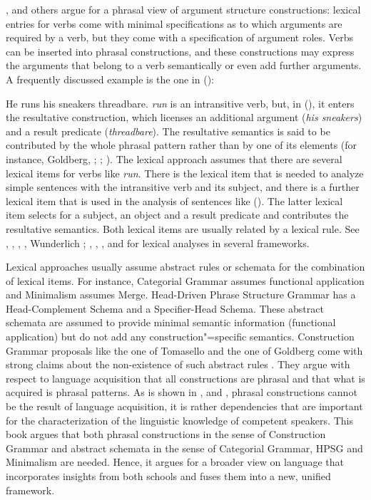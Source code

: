 \citet{Goldberg95a,Goldberg2006a}, \citet{Tomasello2003a} and others argue for a phrasal view of argument structure
constructions: lexical entries for verbs come with minimal specifications as to which arguments are
required by a verb, but they come with a specification of argument roles. Verbs can be inserted into phrasal
constructions, and these constructions may express the arguments that belong to a verb semantically
or even add further arguments. A frequently discussed example is the one in ():


\ea
\label{ex-runshoes-threadbare}
He runs his sneakers threadbare.
\z
\emph{run} is an intransitive verb, but, in (), it enters the resultative construction,
which licenses an additional argument (\emph{his sneakers}) and a result predicate
(\emph{threadbare}). The resultative semantics is said to be contributed by the whole phrasal
pattern rather than by one of its elements (for instance, Goldberg, \citeyear[--89]{Goldberg91a}; \citeyear{Goldberg95a}; ). The lexical approach assumes that there are several lexical items for verbs
like \emph{run}. There is the lexical item that is needed to analyze simple sentences with the
intransitive verb and its subject, and there is a further lexical item that is used in the analysis
of sentences like (). The latter lexical item selects for a subject, an object and a result
predicate and contributes the resultative semantics. Both lexical items are usually related by a lexical
rule. See , , , ,
Wunderlich \citeyear[]{Wunderlich92a-u-kopiert}; \citeyear[--126]{Wunderlich97c}, ,
, and 
for lexical analyses in several frameworks.

Lexical approaches usually assume abstract rules or schemata for the combination of lexical
items. For instance, Categorial Grammar assumes functional application and Minimalism assumes
Merge. Head-Driven Phrase Structure Grammar has a Head-Complement Schema and a Specifier-Head
Schema. These abstract schemata are assumed to provide minimal semantic information (functional
application) but do not add any construction"=specific semantics. Construction Grammar proposals like
the one of Tomasello and the one of Goldberg come with strong claims about the non-existence of such
abstract rules \citep[]{Tomasello2003a}. They argue with respect to language acquisition
that all constructions are phrasal and that what is acquired is phrasal patterns. As is shown
in ,  and ,
phrasal constructions cannot be the result of language acquisition, it is rather dependencies that
are important for the characterization of the linguistic knowledge of competent speakers. This book
argues that both phrasal constructions in the sense of Construction Grammar and abstract schemata in
the sense of Categorial Grammar, HPSG and Minimalism are needed. Hence, it argues for a broader view
on language that incorporates insights from both schools and fuses them into a new, unified
framework.

